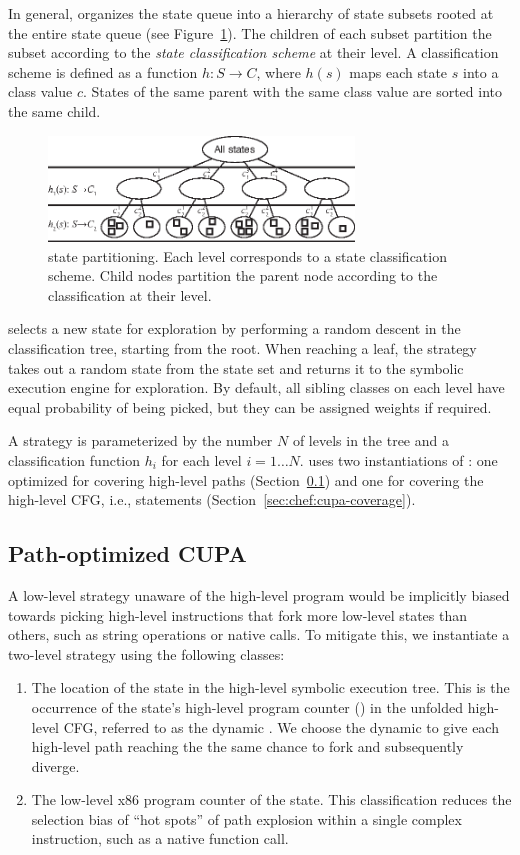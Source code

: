 In general, \cupa organizes the state queue into a hierarchy of state subsets rooted at the entire state queue (see Figure~\ref{fig:cupa}).  The children of each subset partition the subset according to the \emph{state classification scheme} at their level.  A classification scheme is defined as a function $h: S \rightarrow C$, where $h(s)$ maps each state $s$ into a class value $c$.  States of the same parent with the same class value are sorted into the same child.
%
\begin{figure}
  \centering
  \includegraphics[width=3.2in]{chef/figures/cupa}
  \caption{\cupa state partitioning.  Each level corresponds to a state classification scheme.  Child nodes partition the parent node according to the classification at their level.}
  \label{fig:cupa}
\end{figure}
%
\cupa selects a new state for exploration by performing a random descent in the classification tree, starting from the root.  When reaching a leaf, the strategy takes out a random state from the state set and returns it to the symbolic execution engine for exploration.  By default, all sibling classes on each level have equal probability of being picked, but they can be assigned weights if required.

A \cupa strategy is parameterized by the number $N$ of levels in the tree and a classification function $h_i$ for each level $i=1 \ldots N$.  \chef uses two instantiations of \cupa: one optimized for covering high-level paths (Section~\ref{sec:chef:cupa-paths}) and one for covering the high-level CFG, i.e., statements (Section~\ref{sec:chef:cupa-coverage}).

\subsection{Path-optimized CUPA}
\label{sec:chef:cupa-paths}

A low-level strategy unaware of the high-level program would be implicitly biased towards picking high-level instructions that fork more low-level states than others, such as string operations or native calls.
%
To mitigate this, we instantiate a two-level \cupa strategy using the following classes:
\begin{enumerate}
\item The location of the state in the high-level symbolic execution tree.  This is the occurrence of the state's high-level program counter (\hlpc) in the unfolded high-level CFG, referred to as the dynamic \hlpc.  We choose the dynamic \hlpc to give each high-level path reaching the \hlpc the same chance to fork and subsequently diverge.
\item The low-level x86 program counter of the state.  This classification reduces the selection bias of ``hot spots'' of path explosion within a single complex instruction, such as a native function call.
\end{enumerate}

